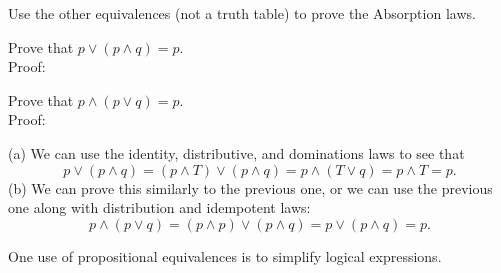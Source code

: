 \begin{exer}
Use the other equivalences (not a truth table) to prove the Absorption laws.
\begin{lenum}
\item
Prove that $p\vee(p\wedge q) = p$.\\
Proof:\\ 
\vspace*{1.75in}
\item
Prove that $p\wedge(p\vee q) = p$.\\
Proof:\\ 
\vspace*{1.75in}
\end{lenum}
\begin{answer}
(a) We can use the identity, distributive, and dominations laws to see that
$$p\vee(p\wedge q) = (p\wedge T)\vee (p\wedge q)=p\wedge(T\vee q) = p\wedge T = p.$$
(b) We can prove this similarly to the previous one, or we can use the previous one
along with distribution and idempotent laws:
$$p\wedge(p\vee q) = (p\wedge p)\vee(p\wedge q) = p\vee(p\wedge q)=p.$$    
\end{answer}
\end{exer}

One use of propositional equivalences is to simplify logical expressions.


